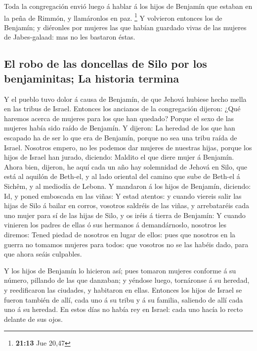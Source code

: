  Toda la congregación envió luego á hablar á los hijos de
Benjamín que estaban en la peña de Rimmón, y llamáronlos en paz.
\footnote{\textbf{21:13} Jue 20,47}  Y volvieron entonces
los de Benjamín; y diéronles por mujeres las que habían guardado vivas
de las mujeres de Jabes-galaad: mas no les bastaron éstas.

\hypertarget{el-robo-de-las-doncellas-de-silo-por-los-benjaminitas-la-historia-termina}{%
\subsection{El robo de las doncellas de Silo por los benjaminitas; La
historia
termina}\label{el-robo-de-las-doncellas-de-silo-por-los-benjaminitas-la-historia-termina}}

 Y el pueblo tuvo dolor á causa de Benjamín, de que
Jehová hubiese hecho mella en las tribus de Israel. 
Entonces los ancianos de la congregación dijeron: ¿Qué haremos acerca de
mujeres para los que han quedado? Porque el sexo de las mujeres había
sido raído de Benjamín.  Y dijeron: La heredad de los que
han escapado ha de ser lo que era de Benjamín, porque no sea una tribu
raída de Israel.  Nosotros empero, no les podemos dar
mujeres de nuestras hijas, porque los hijos de Israel han jurado,
diciendo: Maldito el que diere mujer á Benjamín.  Ahora
bien, dijeron, he aquí cada un año hay solemnidad de Jehová en Silo, que
está al aquilón de Beth-el, y al lado oriental del camino que sube de
Beth-el á Sichêm, y al mediodía de Lebona.  Y mandaron á
los hijos de Benjamín, diciendo: Id, y poned emboscada en las viñas:
 Y estad atentos: y cuando viereis salir las hijas de
Silo á bailar en corros, vosotros saldréis de las viñas, y arrebataréis
cada uno mujer para sí de las hijas de Silo, y os iréis á tierra de
Benjamín:  Y cuando vinieren los padres de ellas ó sus
hermanos á demandárnoslo, nosotros les diremos: Tened piedad de nosotros
en lugar de ellos: pues que nosotros en la guerra no tomamos mujeres
para todos: que vosotros no se las habéis dado, para que ahora seáis
culpables.

 Y los hijos de Benjamín lo hicieron así; pues tomaron
mujeres conforme á su número, pillando de las que danzaban; y yéndose
luego, tornáronse á su heredad, y reedificaron las ciudades, y habitaron
en ellas.  Entonces los hijos de Israel se fueron también
de allí, cada uno á su tribu y á su familia, saliendo de allí cada uno á
su heredad.  En estos días no había rey en Israel: cada
uno hacía lo recto delante de sus ojos.

